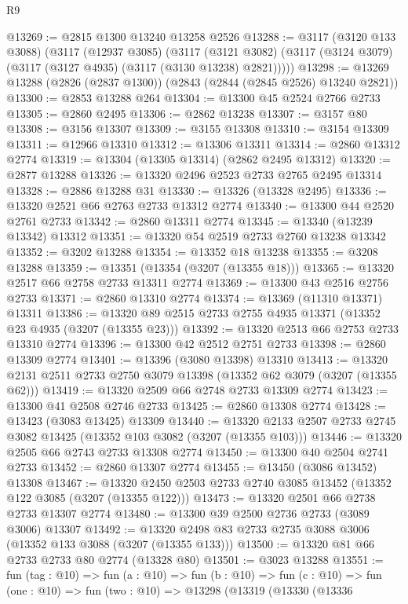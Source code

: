 \begin{lexlean}{R9}
\begin{coremodule}
@13269 := @2815 @1300 @13240 @13258 @2526
@13288 := @3117
    (@3120 @133 @3088)
    (@3117
      (@12937 @3085)
      (@3117
        (@3121 @3082)
        (@3117 (@3124 @3079) (@3117 (@3127 @4935) (@3117 (@3130 @13238) @2821)))))
@13298 := @13269 @13288 (@2826 (@2837 @1300)) (@2843 (@2844 (@2845 @2526) @13240 @2821))
@13300 := @2853 @13288 @264
@13304 := @13300 @45 @2524 @2766 @2733
@13305 := @2860 @2495
@13306 := @2862 @13238
@13307 := @3157 @80
@13308 := @3156 @13307
@13309 := @3155 @13308
@13310 := @3154 @13309
@13311 := @12966 @13310
@13312 := @13306 @13311
@13314 := @2860 @13312 @2774
@13319 := @13304 (@13305 @13314) (@2862 @2495 @13312)
@13320 := @2877 @13288
@13326 := @13320 @2496 @2523 @2733 @2765 @2495 @13314
@13328 := @2886 @13288 @31
@13330 := @13326 (@13328 @2495)
@13336 := @13320 @2521 @66 @2763 @2733 @13312 @2774
@13340 := @13300 @44 @2520 @2761 @2733
@13342 := @2860 @13311 @2774
@13345 := @13340 (@13239 @13342) @13312
@13351 := @13320 @54 @2519 @2733 @2760 @13238 @13342
@13352 := @3202 @13288
@13354 := @13352 @18 @13238
@13355 := @3208 @13288
@13359 := @13351 (@13354 (@3207 (@13355 @18)))
@13365 := @13320 @2517 @66 @2758 @2733 @13311 @2774
@13369 := @13300 @43 @2516 @2756 @2733
@13371 := @2860 @13310 @2774
@13374 := @13369 (@11310 @13371) @13311
@13386 := @13320 @89 @2515 @2733 @2755 @4935 @13371 (@13352 @23 @4935 (@3207 (@13355 @23)))
@13392 := @13320 @2513 @66 @2753 @2733 @13310 @2774
@13396 := @13300 @42 @2512 @2751 @2733
@13398 := @2860 @13309 @2774
@13401 := @13396 (@3080 @13398) @13310
@13413 := @13320 @2131 @2511 @2733 @2750 @3079 @13398 (@13352 @62 @3079 (@3207 (@13355 @62)))
@13419 := @13320 @2509 @66 @2748 @2733 @13309 @2774
@13423 := @13300 @41 @2508 @2746 @2733
@13425 := @2860 @13308 @2774
@13428 := @13423 (@3083 @13425) @13309
@13440 := @13320 @2133 @2507 @2733 @2745 @3082 @13425 (@13352 @103 @3082 (@3207 (@13355 @103)))
@13446 := @13320 @2505 @66 @2743 @2733 @13308 @2774
@13450 := @13300 @40 @2504 @2741 @2733
@13452 := @2860 @13307 @2774
@13455 := @13450 (@3086 @13452) @13308
@13467 := @13320 @2450 @2503 @2733 @2740 @3085 @13452 (@13352 @122 @3085 (@3207 (@13355 @122)))
@13473 := @13320 @2501 @66 @2738 @2733 @13307 @2774
@13480 := @13300 @39 @2500 @2736 @2733 (@3089 @3006) @13307
@13492 := @13320 @2498 @83 @2733 @2735 @3088 @3006 (@13352 @133 @3088 (@3207 (@13355 @133)))
@13500 := @13320 @81 @66 @2733 @2733 @80 @2774 (@13328 @80)
@13501 := @3023 @13288
@13551 := fun (tag : @10) =>
  fun (a : @10) =>
  fun (b : @10) =>
  fun (c : @10) =>
  fun (one : @10) =>
  fun (two : @10) =>
  @13298
    (@13319
      (@13330
        (@13336

\end{coremodule}
\end{lexlean}
